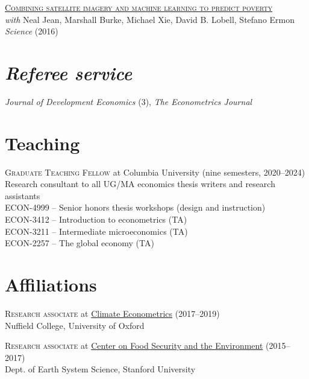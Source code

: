 \documentclass[margin,line]{res}
\begin{document}
\begin{resume}
\href{https://science.sciencemag.org/content/353/6301/790}{\textsc{Combining satellite imagery and machine learning to predict poverty}}\\
\phantom{ }\textit{with} Neal Jean, Marshall Burke, Michael Xie, David B. Lobell, Stefano Ermon \hfill \textit{Science} (2016)
\vspace{-.3cm}


\section{\sc\hfill\textit{Referee service}\phantom{ }\phantom{ }\phantom{ }}

\textit{Journal of Development Economics} ($3$), \textit{The Econometrics Journal}
\vspace{-.3cm}

\section{\sc Teaching}

\textsc{Graduate Teaching Fellow} at Columbia University (nine semesters, 2020--2024)\\
\phantom{ }\phantom{ }Research consultant to all UG/MA economics thesis writers and research assistants\\
\phantom{ }\phantom{ }\textsc{ECON-4999} -- Senior honors thesis workshops (design and instruction)\\
\phantom{ }\phantom{ }\textsc{ECON-3412} -- Introduction to econometrics (TA)\\
\phantom{ }\phantom{ }\textsc{ECON-3211} -- Intermediate microeconomics (TA)\\
\phantom{ }\phantom{ }\textsc{ECON-2257} -- The global economy (TA)
\vspace{-.3cm}

\section{\sc Affiliations}

\textsc{Research associate} at \href{http://www.climateeconometrics.org/about/}{Climate Econometrics} (2017--2019)\\
\phantom{ }\phantom{ }Nuffield College, University of Oxford
\vspace{-.3cm}

\textsc{Research associate} at \href{https://fse.fsi.stanford.edu/}{Center on Food Security and the Environment} (2015--2017)\\
\phantom{ }\phantom{ }Dept. of Earth System Science, Stanford University
\vspace{-.3cm}


\end{resume}
\end{document}
